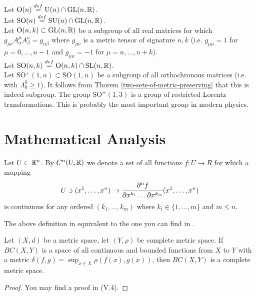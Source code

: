 \documentclass[main.tex]{subfiles}
\begin{document}
Let $\text{O}(n) \stackrel{def}{=} \text{U}(n) \cap \text{GL}(n, \mathbb{R})$.\\

Let $\text{SO}(n) \stackrel{def}{=} \text{SU}(n) \cap \text{GL}(n, \mathbb{R})$.\\


Let $\text{O}(n, k) \subset \text{GL}(n, \mathbb{R})$ be a subgroup of all real matrices for which 
$g_{\mu\nu} A^\mu_\alpha A^\nu_\beta = g_{\alpha\beta}$ where $g_{\mu\nu}$ is a metric tensor of signature $n, k$ (i.e. $g_{\mu\mu} = 1$ for $\mu = 0, \dots, n - 1$ and $g_{\mu\mu} = -1$ for $\mu = n, \dots, n + k$).\\

Let $\text{SO}(n, k) \stackrel{def}{=} \text{O}(n, k) \cap \text{SL}(n, \mathbb{R})$.\\

Let $\text{SO}^+(1, n) \subset \text{SO}(1, n)$ be a subgroup of all orthochronous matrices (i.e. with $\Lambda_0^0 \geq 1$). It follows from Thorem \ref{two-sets-of-metric-preserving} that this is indeed subgroup. The group $\text{SO}^+(1, 3)$ is a group of restricted Lorentz transformations. This is probably the most important group in modern physics.

\section{Mathematical Analysis}
\begin{definition}
Let $U\subset \mathbb{R}^n$.
By $C^n(U, \mathbb{R})$ we denote a set of all functions $f:U\to R$ for which a mapping
\begin{equation}
    U\ni (x^1, \dots, x^n) \to \cfrac{\partial^n f}{\partial x^{k_1} \dots \partial x^{k_m} } (x^1, \dots, x^n)
\end{equation}
is continuous for any ordered $(k_1, \dots, k_m)$ where $k_i\in\{1, \dots, m\}$ and $m\leq n$.
\end{definition}

The above definition in equivalent to the one you can find in \cite{warner1983}. 

\begin{theorem}
\label{continous_functions_space_complete}
Let $(X, d)$ be a metric space, let $(Y, \rho)$ be complete metric space. If $BC(X, Y)$ is a space of all continuous and bounded functions from $X$ to $Y$ with a metric $\delta(f, g) = \sup_{x\in X} \rho(f(x), g(x))$, then $BC(X, Y)$ is a complete metric space.
\end{theorem}
\begin{proof}
You may find a proof in \cite{maurin1976} (V.4).
\end{proof}
\end{document}
